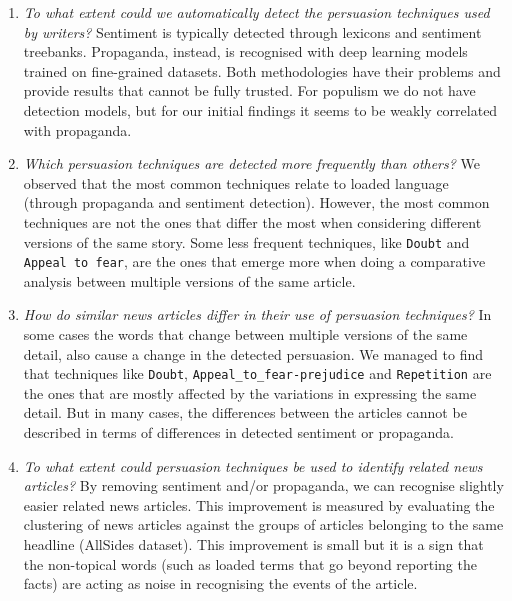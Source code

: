 \begin{enumerate}[label={\textbf{RQ2.\arabic*:}},leftmargin=2cm]
    \item \emph{To what extent could we automatically detect the persuasion techniques used by writers?} Sentiment is typically detected through lexicons and sentiment treebanks. Propaganda, instead, is recognised with deep learning models trained on fine-grained datasets. Both methodologies have their problems and provide results that cannot be fully trusted. For populism we do not have detection models, but for our initial findings it seems to be weakly correlated with propaganda.
    \item \emph{Which persuasion techniques are detected more frequently than others?} We observed that the most common techniques relate to loaded language (through propaganda and sentiment detection). However, the most common techniques are not the ones that differ the most when considering different versions of the same story. %
          Some less frequent
          techniques, like \texttt{Doubt} and \texttt{Appeal to fear}, are the ones that emerge more when doing a comparative analysis between multiple versions of the same article.
    \item \emph{How do similar news articles differ in their use of persuasion techniques?} In some cases the words that change between multiple versions of the same detail, also cause a change in the detected persuasion. We managed to find that techniques like \texttt{Doubt}, \texttt{Appeal\_to\_fear-prejudice} and \texttt{Repetition} are the ones that are mostly affected by the variations in expressing the same detail. But in many cases, the differences between the articles cannot be described in terms of differences in detected sentiment or propaganda. %
    \item \emph{To what extent could persuasion techniques be used to identify related news articles?} By removing sentiment and/or propaganda, we can recognise slightly easier related news articles.
          This improvement is measured by evaluating the clustering of news articles against the groups of articles belonging to the same headline (AllSides dataset).
          This improvement is small but it is a sign that the non-topical words (such as loaded terms that go beyond reporting the facts) are acting as noise in recognising the events of the article. %
\end{enumerate}


